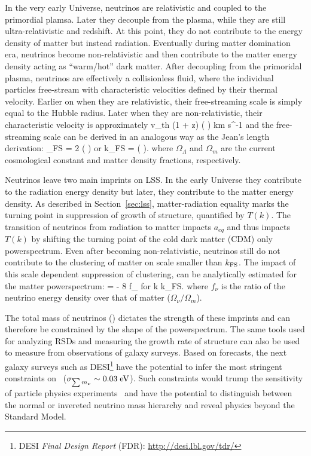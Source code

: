 In the very early Universe, neutrinos are relativistic and coupled to the 
primordial plamsa. Later they decouple from the plasma, while they are still 
ultra-relativistic and redshift. At this point, they do not 
contribute to the energy density of matter but instead radiation. Eventually during 
matter domination era, neutrinos become non-relativistic and then contribute 
to the matter energy density acting as ``warm/hot'' dark matter.
After decoupling from the primoridal plasma, neutrinos are effectively a
collisionless fluid, where the individual particles free-stream with 
characteristic velocities defined by their thermal velocity. Earlier on 
when they are relativistic, their free-streaming scale is simply 
equal to the Hubble radius. Later when they are non-relativistic, 
their characteristic velocity is approximately  
\beq
v_{\rm th}  (1 + z) \left( \right) \; \; {\rm km \; s^{-1}}
\eeq
and the free-streaming scale can be derived in an analogous way as the 
Jean's length derivation: 
\beq
\lambda_{\rm FS} = 2 \pi {} \left(  \right)
\eeq
or 
\beq \label{eq:kfs}
k_{\rm FS} =    \left( \right).
\eeq
where $\Omega_\Lambda$ and $\Omega_m$ are the current cosmological constant and matter 
density fractions, respectively.

Neutrinos leave two main imprints on LSS. In the early Universe they contribute
to the radiation energy density but later, they contribute to the matter energy 
density. As described in 
Section~\ref{sec:lss}, matter-radiation equality marks the turning point in 
suppression of growth of structure, quantified by $T(k)$. The transition of 
neutrinos from radiation to matter impacts $a_{eq}$ and thus impacts $T(k)$ by 
shifting the turning point of the cold dark matter (CDM) only powerspectrum. 
Even after becoming non-relativistic, neutrinos still do not contribute to the
clustering of matter on scale smaller than $k_{\rm FS}$. The impact of this scale dependent 
suppression of clustering, can be analytically estimated for the matter powerspectrum: 
\beq
{} =  \approx - 8 f_\nu \;\;\;\; {\rm for}\;\; k \gg k_{\rm FS}.
\eeq
where $f_\nu$ is the ratio of the neutrino energy density over that of matter 
($\Omega_\nu / \Omega_m$).

The total mass of neutrinos (\mneut) dictates the strength of these imprints and  
can therefore be constrained by the shape of the powerspectrum. The same tools 
used for analyzing RSDs and measuring the growth rate of structure can also be 
used to measure \mneut\; from observations of galaxy surveys.
Based on forecasts, the next galaxy surveys such as 
DESI\footnote{DESI \textit{Final Design Report} (FDR): \url{http://desi.lbl.gov/tdr/}} 
have the potential to infer the most stringent constraints on 
\mneut~($\sigma_{\sum m_\nu} \sim 0.03\;{\rm eV}$). Such constraints would 
trump the sensitivity of particle physics experiments~\citep[][]{Wolf_Katrin}
and have the potential to distinguish
between the normal or invereted neutrino mass hierarchy and reveal physics
beyond the Standard Model.

